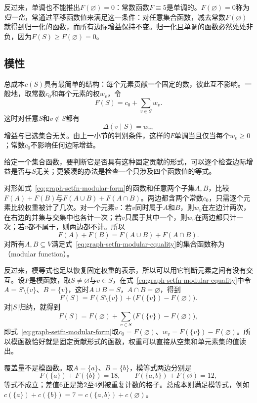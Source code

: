 反过来，单调也不能推出$F(\varnothing)=0$：常数函数$F\equiv5$是单调的。$F(\varnothing)=0$称为\emph{归一化}，常通过平移函数值来满足这一条件：对任意集合函数，减去常数$F(\varnothing)$就得到归一化的函数，而所有边际增益保持不变。归一化且单调的函数必然处处非负，因为$F(S)\geq F(\varnothing)=0$。

\subsection{模性}
\label{sec:graph-setfn-modularity}

总成本$c(S)$具有最简单的结构：每个元素贡献一个固定的数，彼此互不影响。一般地，取常数$c_0$和每个元素的权$w_v$，令
\begin{equation}
  F(S)=c_0+\sum_{v\in S}w_v .
  \label{eq:graph-setfn-modular-form}
\end{equation}
这时对任意$S$和$v\notin S$都有
\[
  \Delta(v\mid S)=w_v,
\]
增益与已选集合无关。由上一小节的判别条件，这样的$F$单调当且仅当每个$w_v\geq0$；常数$c_0$不影响任何边际增益。

给定一个集合函数，要判断它是否具有这种固定贡献的形式，可以逐个检查边际增益是否与$S$无关；更紧凑的办法是检查一个只涉及四个函数值的等式。

对形如式~\eqref{eq:graph-setfn-modular-form}的函数和任意两个子集$A,B$，比较$F(A)+F(B)$与$F(A\cup B)+F(A\cap B)$。两边都含两个常数$c_0$，只需逐个元素比较权重被计了几次。对一个元素$v$：若$v$同时属于$A$和$B$，则$w_v$在左边计两次，在右边的并集与交集中也各计一次；若$v$只属于其中一个，则$w_v$在两边都只计一次；若$v$都不属于，则两边都不计。所以
\begin{equation}
  F(A)+F(B)=F(A\cup B)+F(A\cap B).
  \label{eq:graph-setfn-modular-equality}
\end{equation}
对所有$A,B\subseteq V$满足式~\eqref{eq:graph-setfn-modular-equality}的集合函数称为（modular function）。

反过来，模等式也足以恢复固定权重的表示，所以可以用它判断元素之间有没有交互。设$F$是模函数，取$S\neq\varnothing$与$v\in S$，在式~\eqref{eq:graph-setfn-modular-equality}中令$A=S\setminus\{v\}$、$B=\{v\}$，这时$A\cup B=S$，$A\cap B=\varnothing$，得到
\[
  F(S)=F(S\setminus\{v\})+\bigl(F(\{v\})-F(\varnothing)\bigr).
\]
对$|S|$归纳，就得到
\[
  F(S)=F(\varnothing)+\sum_{v\in S}\bigl(F(\{v\})-F(\varnothing)\bigr),
\]
即式~\eqref{eq:graph-setfn-modular-form}取$c_0=F(\varnothing)$、$w_v=F(\{v\})-F(\varnothing)$。所以模函数恰好就是固定贡献形式的函数，权重可以直接从空集和单元素集的值读出。

覆盖量不是模函数。取$A=\{a\}$、$B=\{b\}$，模等式两边分别是
\[
  F(\{a\})+F(\{b\})=18,\qquad F(\{a,b\})+F(\varnothing)=12,
\]
等式不成立；差值$6$正是第$2$至$4$列被重复计数的格子。总成本则满足模等式，例如$c(\{a\})+c(\{b\})=7=c(\{a,b\})+c(\varnothing)$。

